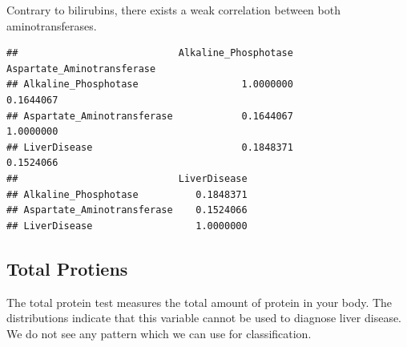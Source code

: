 \documentclass[]{article}
\newenvironment{Shaded}{\begin{snugshade}}{\end{snugshade}}
\newcommand{\CommentTok}[1]{\textcolor[rgb]{0.56,0.35,0.01}{\textit{#1}}}
\newcommand{\DataTypeTok}[1]{\textcolor[rgb]{0.13,0.29,0.53}{#1}}
\newcommand{\DecValTok}[1]{\textcolor[rgb]{0.00,0.00,0.81}{#1}}
\newcommand{\KeywordTok}[1]{\textcolor[rgb]{0.13,0.29,0.53}{\textbf{#1}}}
\newcommand{\NormalTok}[1]{#1}
\newcommand{\OperatorTok}[1]{\textcolor[rgb]{0.81,0.36,0.00}{\textbf{#1}}}
\newcommand{\StringTok}[1]{\textcolor[rgb]{0.31,0.60,0.02}{#1}}
\begin{document}
Contrary to bilirubins, there exists a weak correlation between both
aminotransferases.

\begin{Shaded}
\end{Shaded}

\begin{verbatim}
##                            Alkaline_Phosphotase Aspartate_Aminotransferase
## Alkaline_Phosphotase                  1.0000000                  0.1644067
## Aspartate_Aminotransferase            0.1644067                  1.0000000
## LiverDisease                          0.1848371                  0.1524066
##                            LiverDisease
## Alkaline_Phosphotase          0.1848371
## Aspartate_Aminotransferase    0.1524066
## LiverDisease                  1.0000000
\end{verbatim}

\subsection{Total Protiens}

The total protein test measures the total amount of protein in your
body. The distributions indicate that this variable cannot be used to
diagnose liver disease. We do not see any pattern which we can use for
classification.
\end{document}

